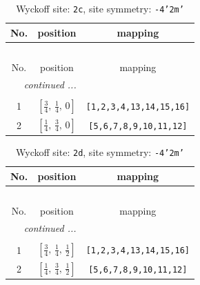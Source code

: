 \documentclass[fleqn,8pt]{jsarticle}
\begin{document}
\renewcommand{\arraystretch}{1.2}
\begin{longtable}{ccc}
\caption{Wyckoff site: {\tt 2c}, site symmetry: {\tt -4'2m'}}
 \\
 \hline \hline
No. & position & mapping \\ \hline \endfirsthead

\multicolumn{2}{l}{\tablename\ \thetable{}} \\
 \hline \hline
No. & position & mapping \\ \hline \endhead

 \hline \hline
\multicolumn{2}{r}{\footnotesize\it continued ...} \\ \endfoot

 \hline \hline
\multicolumn{2}{r}{} \\ \endlastfoot

1 & $\left[ \frac{3}{4},\, \frac{1}{4},\, 0 \right]$ & {\tt [1,2,3,4,13,14,15,16]} \\ \hline
2 & $\left[ \frac{1}{4},\, \frac{3}{4},\, 0 \right]$ & {\tt [5,6,7,8,9,10,11,12]} \\
\end{longtable}
\renewcommand{\arraystretch}{1.2}
\begin{longtable}{ccc}
\caption{Wyckoff site: {\tt 2d}, site symmetry: {\tt -4'2m'}}
 \\
 \hline \hline
No. & position & mapping \\ \hline \endfirsthead

\multicolumn{2}{l}{\tablename\ \thetable{}} \\
 \hline \hline
No. & position & mapping \\ \hline \endhead

 \hline \hline
\multicolumn{2}{r}{\footnotesize\it continued ...} \\ \endfoot

 \hline \hline
\multicolumn{2}{r}{} \\ \endlastfoot

1 & $\left[ \frac{3}{4},\, \frac{1}{4},\, \frac{1}{2} \right]$ & {\tt [1,2,3,4,13,14,15,16]} \\ \hline
2 & $\left[ \frac{1}{4},\, \frac{3}{4},\, \frac{1}{2} \right]$ & {\tt [5,6,7,8,9,10,11,12]} \\
\end{longtable}
\renewcommand{\arraystretch}{1.2}
\end{document}
